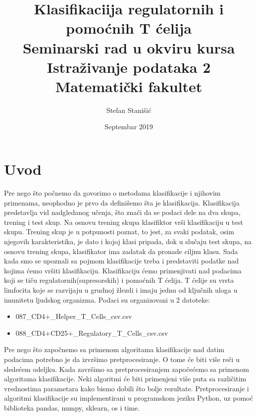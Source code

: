 \documentclass[a4paper]{article}
\begin{document}
\title{Klasifikaciija regulatornih  i pomoćnih T ćelija\\ \small{Seminarski rad u okviru kursa\\Istraživanje podataka 2\\ Matematički fakultet}}

\author{Stefan Stanišić}

\date{Septembar 2019}

\maketitle


\tableofcontents

\section{Uvod}

Pre nego što počnemo da govorimo o metodama klasifikacije i njihovim primenama, neophodno je prvo da definišemo šta je klasifikacija. Klasifikacija predstavlja vid nadgledanog učenja, što znači da se podaci dele na dva skupa, trening i test skup. Na osnovu trening skupa klasifiktor vrši klasifikaciju
u test skupu. Trening skup je u potpunosti poznat, to jest, za svaki podatak, osim njegovih karakteristika, je dato i kojoj klasi pripada, dok u
slučaju test skupa, na osnovu trening skupa, klasifikator ima zadatak da pronade ciljnu klasu. Sada kada smo se upoznali sa pojmom klasifikacije treba i predstaviti podatke nad kojima
ćemo vršiti klasifikaciju. Klasifikaciju ćemo primenjivati nad podacima koji se tiču regulatornih(supresorskih) i pomoćnih T ćelija. T ćelije su vrsta limfocita koje se razvijaju u grudnoj žlezdi i imaju jednu od ključnih uloga u imunitetu ljudskog organizma. 
Podaci su organizovani u 2 datoteke:
\begin{itemize}
\item  087\_CD4+\_Helper\_T\_Cells\_csv.csv
\item 088\_CD4+CD25+\_Regulatory\_T\_Cells\_csv.csv
\end{itemize}

Pre nego što započnemo sa primenom algoritama klasifikacije nad datim podacima potrebno je da izvršimo pretprocesiranje.  O tome će biti više reči u sledećem odeljku. Kada završimo sa pretprocesiranjem započećemo sa primenom algoritama klasifikacije. Neki algoritmi će biti primenjeni više puta sa različitim vrednostima parametara kako bismo dobili što bolje rezultate.
Pretprocesiranje i algoritmi klasifikacije su implementirani u programskom jeziku Python,  uz pomoć biblioteka pandas, numpy, sklearn,  os i time.
\end{document}
